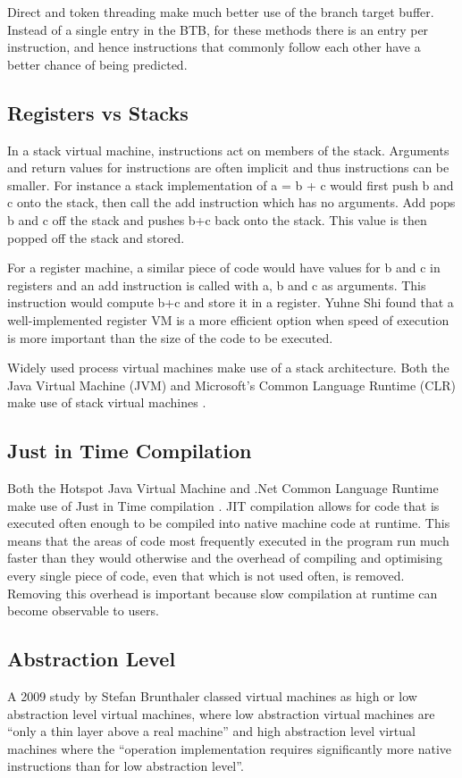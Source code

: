 \documentclass[english,a4paper,12pt]{report}
\begin{document}
Direct and token threading make much better use of the branch target
buffer. Instead of a single entry in the BTB, for these methods there
is an entry per instruction, and hence instructions that commonly
follow each other have a better chance of being predicted.

\subsection{Registers vs Stacks}
In a stack virtual machine, instructions act on members of the
stack. Arguments and return values for instructions are often implicit
and thus instructions can be smaller. For instance a stack
implementation of a = b + c would first push b and c onto the stack,
then call the add instruction which has no arguments. Add pops b and c
off the stack and pushes b+c back onto the stack. This value is then
popped off the stack and stored.

For a register machine, a similar piece of code would have values for
b and c in registers and an add instruction is called with a, b and c
as arguments. This instruction would compute b+c and store it in a
register. Yuhne Shi\cite{Shi2007} found that a well-implemented
register VM is a more efficient option when speed of execution is more
important than the size of the code to be executed.

Widely used process virtual machines make use of a stack
architecture. Both the Java Virtual Machine (JVM) and Microsoft's
Common Language Runtime (CLR) make use of stack virtual machines
\cite{CLI}\cite{JVM}.

\subsection{Just in Time Compilation}

Both the Hotspot Java Virtual Machine and .Net Common Language Runtime
make use of Just in Time compilation \cite{JVMJIT} \cite{CLRJIT}. JIT
compilation allows for code that is executed often enough to be
compiled into native machine code at runtime. This means that the
areas of code most frequently executed in the program run much faster
than they would otherwise and the overhead of compiling and optimising
every single piece of code, even that which is not used often, is
removed. Removing this overhead is important because slow compilation
at runtime can become observable to users.

\subsection{Abstraction Level}
\label{sec:abstraction-level}
A 2009 study \cite{Brunthaler20093} by Stefan Brunthaler classed
virtual machines as high or low abstraction level virtual machines,
where low abstraction virtual machines are ``only a thin layer above a
real machine'' and high abstraction level virtual machines where the
``operation implementation requires significantly more native
instructions than for low abstraction level''.
\end{document}
